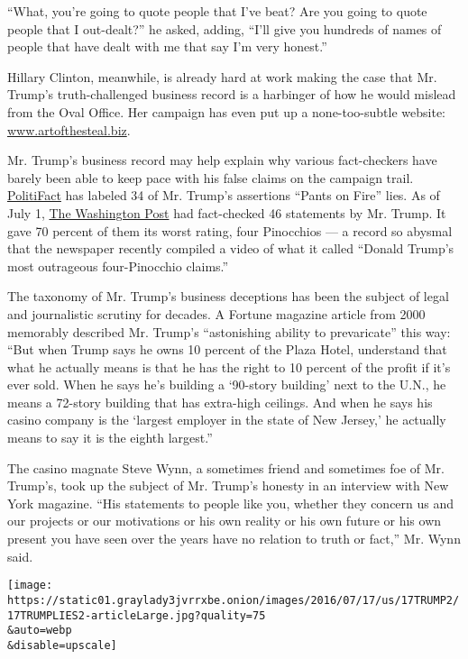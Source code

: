 ``What, you're going to quote people that I've beat? Are you going to
quote people that I out-dealt?'' he asked, adding, ``I'll give you
hundreds of names of people that have dealt with me that say I'm very
honest.''

Hillary Clinton, meanwhile, is already hard at work making the case that
Mr. Trump's truth-challenged business record is a harbinger of how he
would mislead from the Oval Office. Her campaign has even put up a
none-too-subtle website:
\href{http://www.artofthesteal.biz/}{www.artofthesteal.biz}.

Mr. Trump's business record may help explain why various fact-checkers
have barely been able to keep pace with his false claims on the campaign
trail.
\href{http://www.politifact.com/personalities/donald-trump/}{PolitiFact}
has labeled 34 of Mr. Trump's assertions ``Pants on Fire'' lies. As of
July 1,
\href{https://www.washingtonpost.com/news/fact-checker/wp/2016/06/10/fact-checker-video-donald-trumps-most-outrageous-four-pinocchio-claims/}{The
Washington Post} had fact-checked 46 statements by Mr. Trump. It gave 70
percent of them its worst rating, four Pinocchios --- a record so
abysmal that the newspaper recently compiled a video of what it called
``Donald Trump's most outrageous four-Pinocchio claims.''

The taxonomy of Mr. Trump's business deceptions has been the subject of
legal and journalistic scrutiny for decades. A Fortune magazine article
from 2000 memorably described Mr. Trump's ``astonishing ability to
prevaricate'' this way: ``But when Trump says he owns 10 percent of the
Plaza Hotel, understand that what he actually means is that he has the
right to 10 percent of the profit if it's ever sold. When he says he's
building a `90-story building' next to the U.N., he means a 72-story
building that has extra-high ceilings. And when he says his casino
company is the `largest employer in the state of New Jersey,' he
actually means to say it is the eighth largest.''

The casino magnate Steve Wynn, a sometimes friend and sometimes foe of
Mr. Trump's, took up the subject of Mr. Trump's honesty in an interview
with New York magazine. ``His statements to people like you, whether
they concern us and our projects or our motivations or his own reality
or his own future or his own present you have seen over the years have
no relation to truth or fact,'' Mr. Wynn said.

\texttt{[image: https://static01.graylady3jvrrxbe.onion/images/2016/07/17/us/17TRUMP2/17TRUMPLIES2-articleLarge.jpg?quality=75\\\&auto=webp\\\&disable=upscale]}

